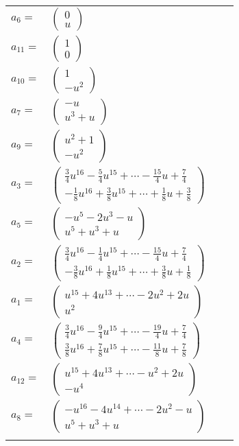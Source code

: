 \documentclass[1p]{elsarticle_modified}
\theoremstyle{definition}
\begin{document}
\begin{tabular}{m{7pt} m{180pt} m{7pt} m{180pt} }
\flushright $a_{6}=$&$\begin{pmatrix}0\\u\end{pmatrix}$ \\
\flushright $a_{11}=$&$\begin{pmatrix}1\\0\end{pmatrix}$ \\
\flushright $a_{10}=$&$\begin{pmatrix}1\\- u^2\end{pmatrix}$ \\
\flushright $a_{7}=$&$\begin{pmatrix}- u\\u^3+u\end{pmatrix}$ \\
\flushright $a_{9}=$&$\begin{pmatrix}u^2+1\\- u^2\end{pmatrix}$ \\
\flushright $a_{3}=$&$\begin{pmatrix}\frac{3}{4} u^{16}-\frac{5}{4} u^{15}+\cdots-\frac{15}{4} u+\frac{7}{4}\\-\frac{1}{8} u^{16}+\frac{3}{8} u^{15}+\cdots+\frac{1}{8} u+\frac{3}{8}\end{pmatrix}$ \\
\flushright $a_{5}=$&$\begin{pmatrix}- u^5-2 u^3- u\\u^5+u^3+u\end{pmatrix}$ \\
\flushright $a_{2}=$&$\begin{pmatrix}\frac{3}{4} u^{16}-\frac{1}{4} u^{15}+\cdots-\frac{15}{4} u+\frac{7}{4}\\-\frac{3}{8} u^{16}+\frac{1}{8} u^{15}+\cdots+\frac{3}{8} u+\frac{1}{8}\end{pmatrix}$ \\
\flushright $a_{1}=$&$\begin{pmatrix}u^{15}+4 u^{13}+\cdots-2 u^2+2 u\\u^2\end{pmatrix}$ \\
\flushright $a_{4}=$&$\begin{pmatrix}\frac{3}{4} u^{16}-\frac{9}{4} u^{15}+\cdots-\frac{19}{4} u+\frac{7}{4}\\\frac{3}{8} u^{16}+\frac{7}{8} u^{15}+\cdots-\frac{11}{8} u+\frac{7}{8}\end{pmatrix}$ \\
\flushright $a_{12}=$&$\begin{pmatrix}u^{15}+4 u^{13}+\cdots- u^2+2 u\\- u^4\end{pmatrix}$ \\
\flushright $a_{8}=$&$\begin{pmatrix}- u^{16}-4 u^{14}+\cdots-2 u^2- u\\u^5+u^3+u\end{pmatrix}$\\&\end{tabular}
\end{document}

